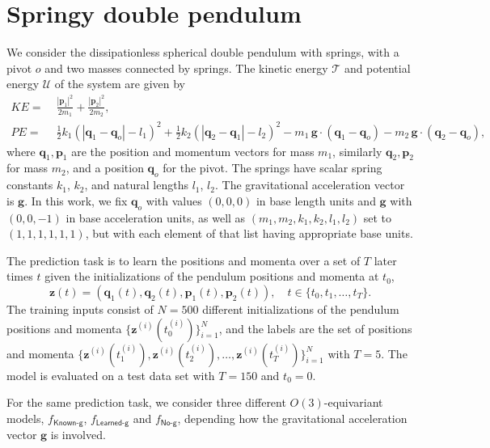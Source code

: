 \documentclass[]{article} %
\renewcommand{\mathcal}[1]{\mathscr{#1}} %
\begin{document}
\section{Springy double pendulum}\label{app:pendulum}
We consider the dissipationless spherical double pendulum with springs, with a pivot $o$ and two masses connected by springs. The kinetic energy $\mathcal{T}$ and potential energy $\mathcal{U}$ of the system are given by
\begin{align}
    KE =&\;\frac{|\mathbf{p}_1|^2}{2m_1} +\frac{|\mathbf{p}_2|^2}{2m_2}, \label{eq:energy_T}\\
    PE =&\;\frac12 k_1(|\mathbf{q}_1-\mathbf{q}_o|-l_1)^2 + \frac12 k_2(|\mathbf{q}_2-\mathbf{q}_1|-l_2)^2 
    -m_1\,\mathbf{g}\cdot (\mathbf{q}_1-\mathbf{q}_o)- m_2 \,\mathbf{g}\cdot  (\mathbf{q}_2-\mathbf{q}_o), \label{eq:energy_U}
\end{align}
where $\mathbf{q}_1, \mathbf{p}_1$ are the position and momentum vectors for mass $m_1$, similarly $\mathbf{q}_2, \mathbf{p}_2$ for mass $m_2$, and a position $\mathbf{q}_o$ for the pivot. The springs have scalar spring constants $k_1$, $k_2$, and natural lengths $l_1$, $l_2$. The gravitational acceleration vector is $\mathbf{g}$. 
In this work, we fix $\mathbf{q}_o$ with values $(0,0,0)$ in base length units and $\mathbf{g}$ with $(0,0,-1)$ in base acceleration units, as well as $(m_1, m_2, k_1, k_2, l_1, l_2)$ set to $(1,1,1,1,1,1)$, but with each element of that list having appropriate base units. 

The prediction task is to learn the positions and momenta over a set of $T$ later times $t$ given the initializations of the pendulum positions and momenta at $t_0$,
\begin{equation}
\mathbf{z}(t)=(\mathbf{q}_1(t),\mathbf{q}_2(t),\mathbf{p}_1(t),\mathbf{p}_2(t)), \quad t\in\{t_0, t_1,\ldots,t_T\}. 
\end{equation}
The training inputs consist of $N=500$ different initializations of the pendulum positions and momenta $\{\mathbf{z}^{(i)}(t_0^{(i)})\}_{i=1}^N$, and the labels are the set of positions and momenta $\{\mathbf{z}^{(i)}(t_1^{(i)}),\mathbf{z}^{(i)}(t_2^{(i)}),\ldots,\mathbf{z}^{(i)}(t_T^{(i)})\}_{i=1}^N$ with $T=5$.
The model is evaluated on a test data set with $T=150$ and $t_0=0$. 

For the same prediction task, we consider three different $O(3)$-equivariant models, $f_{\textsf{Known-g}}$, $f_{\textsf{Learned-g}}$ and $f_{\textsf{No-g}}$, depending how the gravitational acceleration vector $\mathbf{g}$ is involved. 
\end{document}
